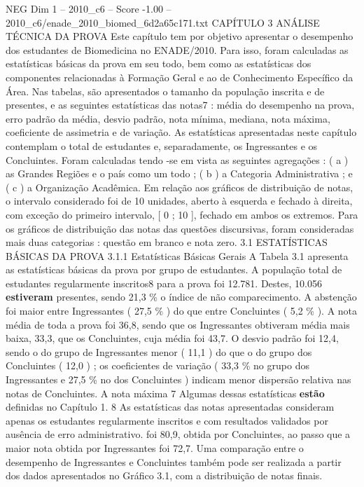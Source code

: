 \begin{textsample}{NEG Dim 1 – 2010\_c6 – Score -1.00 – 2010\_c6/enade\_2010\_biomed\_6d2a65c171.txt}  \label{ex:f1_neg_280}
CAPÍTULO 3 ANÁLISE TÉCNICA DA PROVA Este capítulo tem por objetivo apresentar o desempenho dos estudantes de Biomedicina no ENADE/2010.
Para isso, foram calculadas as estatísticas básicas da prova em seu todo, bem como as estatísticas dos componentes relacionadas à Formação Geral e ao de Conhecimento Específico da Área.
Nas tabelas, são apresentados o tamanho da população inscrita e de presentes, e as seguintes estatísticas das notas7 : média do desempenho na prova, erro padrão da média, desvio padrão, nota mínima, mediana, nota máxima, coeficiente de assimetria e de variação.
As estatísticas apresentadas neste capítulo contemplam o total de estudantes e, separadamente, os Ingressantes e os Concluintes.
Foram calculadas tendo -se em vista as seguintes agregações : ( a ) as Grandes Regiões e o país como um todo ; ( b ) a Categoria Administrativa ; e ( c ) a Organização Acadêmica.
Em relação aos gráficos de distribuição de notas, o intervalo considerado foi de 10 unidades, aberto à esquerda e fechado à direita, com exceção do primeiro intervalo, [ 0 ; 10 ], fechado em ambos os extremos.
Para os gráficos de distribuição das notas das questões discursivas, foram consideradas mais duas categorias : questão em branco e nota zero. 3.1 ESTATÍSTICAS BÁSICAS DA PROVA 3.1.1 Estatísticas Básicas Gerais A Tabela 3.1 apresenta as estatísticas básicas da prova por grupo de estudantes.
A população total de estudantes regularmente inscritos8 para a prova foi 12.781.
Destes, 10.056 \textbf{estiveram} presentes, sendo 21,3 \% o índice de não comparecimento.
A abstenção foi maior entre Ingressantes ( 27,5 \% ) do que entre Concluintes ( 5,2 \% ).
A nota média de toda a prova foi 36,8, sendo que os Ingressantes obtiveram média mais baixa, 33,3, que os Concluintes, cuja média foi 43,7.
O desvio padrão foi 12,4, sendo o do grupo de Ingressantes menor ( 11,1 ) do que o do grupo dos Concluintes ( 12,0 ) ; os coeficientes de variação ( 33,3 \% no grupo dos Ingressantes e 27,5 \% no dos Concluintes ) indicam menor dispersão relativa nas notas de Concluintes.
A nota máxima 7 Algumas dessas estatísticas \textbf{estão} definidas no Capítulo 1. 8 As estatísticas das notas apresentadas consideram apenas os estudantes regularmente inscritos e com resultados validados por ausência de erro administrativo. foi 80,9, obtida por Concluintes, ao passo que a maior nota obtida por Ingressantes foi 72,7.
Uma comparação entre o desempenho de Ingressantes e Concluintes também pode ser realizada a partir dos dados apresentados no Gráfico 3.1, com a distribuição de notas finais.

\end{textsample}
